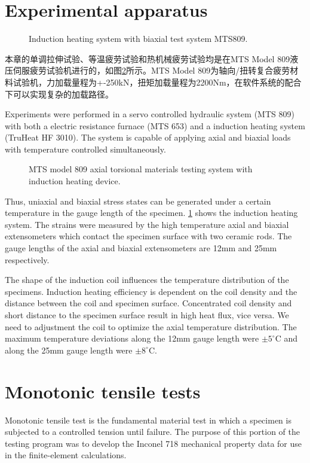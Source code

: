 \section{Experimental apparatus}

\begin{figure}[!htp]
\centering{}
\caption{Induction heating system with biaxial test system MTS809.}
\label{Fig:Equipment}
\end{figure}

本章的单调拉伸试验、等温疲劳试验和热机械疲劳试验均是在MTS Model 809液压伺服疲劳试验机进行的，如图\ref{Fig:MTS809}所示。MTS Model 809为轴向/扭转复合疲劳材料试验机，力加载量程为+-250kN，扭矩加载量程为2200Nm，在软件系统的配合下可以实现复杂的加载路径。


Experiments were performed in a servo controlled hydraulic system (MTS 809) with both a electric resistance furnace (MTS 653) and a induction heating system (TruHeat HF 3010).
The system is capable of applying axial and biaxial loads with temperature controlled simultaneously.
\begin{figure}[!htp]
\centering{}
\caption{MTS model 809 axial torsional materials testing system with induction heating device.}
\label{Fig:MTS809}
\end{figure}
Thus, uniaxial and biaxial stress states can be generated under a certain temperature in the gauge length of the specimen.
\ref{Fig:Equipment} shows the induction heating system.
The strains were measured by the high temperature axial and biaxial extensometers which contact the specimen surface with two ceramic rods.
The gauge lengths of the axial and biaxial extensometers are 12mm and 25mm respectively.

The shape of the induction coil influences the temperature distribution of the specimens.
Induction heating efficiency is dependent on the coil density and the distance between the coil and specimen surface.
Concentrated coil density and short distance to the specimen surface result in high heat flux, vice versa.
We need to adjustment the coil to optimize the axial temperature distribution.
The maximum temperature deviations along the 12mm gauge length were $\pm5^{\circ}$C and along the 25mm gauge length were $\pm8^{\circ}$C.



\section{Monotonic tensile tests}
\noindent Monotonic tensile test is the fundamental material test in which a specimen is subjected to a controlled tension until failure.
The purpose of this portion of the testing program was to develop the Inconel 718 mechanical property data for use in the finite-element calculations.

